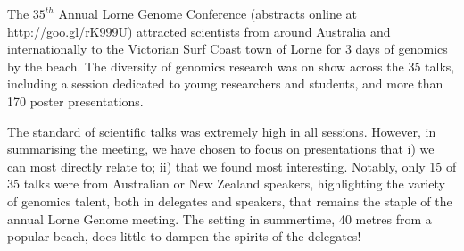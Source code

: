 \documentclass[twocolumn]{bmcart}%
\begin{document}




The $35^{th}$ Annual Lorne Genome Conference (abstracts online at http://goo.gl/rK999U) attracted scientists from around Australia and internationally to the Victorian Surf Coast town of Lorne for 3 days of genomics by the beach. The diversity of genomics research was on show across the 35 talks, including a session dedicated to young researchers and students, and more than 170 poster presentations.

The standard of scientific talks was extremely high in all sessions.  However, in summarising the meeting, we have chosen to focus on presentations that i) we can most directly relate to; ii) that we found most interesting.  Notably, only 15 of 35 talks were from Australian or New Zealand speakers, highlighting the variety of genomics talent, both in delegates and speakers, that remains the staple of the annual Lorne Genome meeting.  The setting in summertime, 40 metres from a popular beach, does little to dampen the spirits of the delegates!


%
\end{document}
